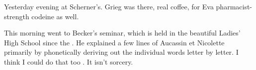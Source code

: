 
Yesterday evening at Scherner's. Grieg was there, real coffee, for Eva pharmacist-strength codeine as well.

This morning went to Becker's seminar, which is held in the beautiful Ladies' High School since the . He explained a few lines of Aucassin et Nicolette primarily by phonetically deriving out the individual words letter by letter. I think I could do that too . It isn't sorcery. \missing

